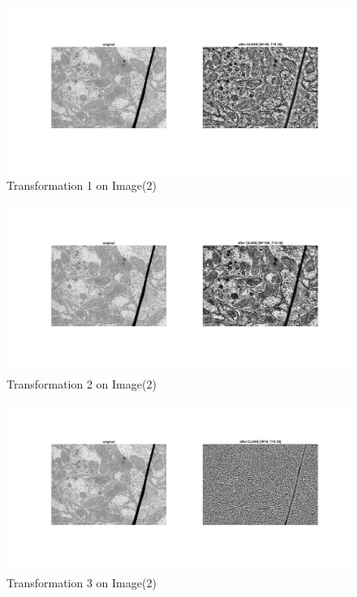 \documentclass[12pt, a4paper]{article}
\begin{document}
\renewcommand{\thefigure}{5.21}
\begin{figure}[H]
    \centering
    \vspace*{-30pt}
    \includegraphics[width=\textwidth]{e21.jpg}
    \vspace*{-80pt}
    \caption{Transformation 1 on Image(2)}
    \label{fig:5.21}
\end{figure}
\renewcommand{\thefigure}{5.22}
\begin{figure}[H]
    \centering
    \vspace*{-30pt}
    \includegraphics[width=\textwidth]{e22.jpg}
    \vspace*{-80pt}
    \caption{Transformation 2 on Image(2)}
    \label{fig:5.22}
\end{figure}
\renewcommand{\thefigure}{5.23}
\begin{figure}[H]
    \centering
    \includegraphics[width=\textwidth]{e23.jpg}
    \vspace*{-80pt}
    \caption{Transformation 3 on Image(2)}
    \label{fig:5.23}
\end{figure}
\end{document}
